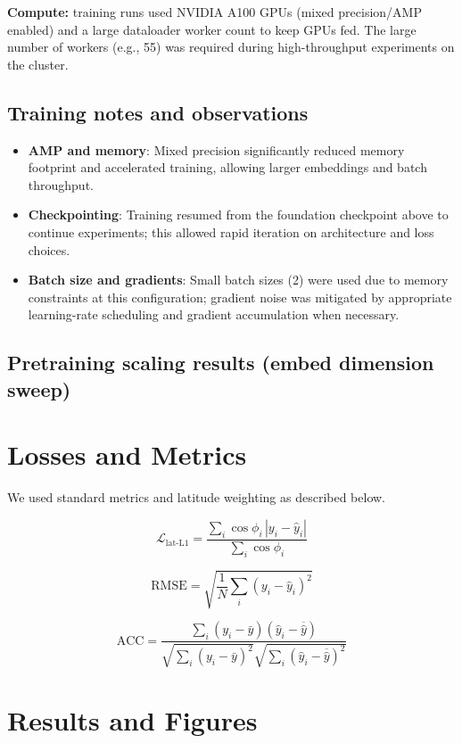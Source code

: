 \documentclass[12pt]{report}
\begin{document}
\noindent\textbf{Compute:} training runs used NVIDIA A100 GPUs (mixed precision/AMP enabled) and a large dataloader worker count to keep GPUs fed. The large number of workers (e.g., 55) was required during high-throughput experiments on the cluster.

\section{Training notes and observations}
\begin{itemize}
  \item \textbf{AMP and memory}: Mixed precision significantly reduced memory footprint and accelerated training, allowing larger embeddings and batch throughput.
  \item \textbf{Checkpointing}: Training resumed from the foundation checkpoint above to continue experiments; this allowed rapid iteration on architecture and loss choices.
  \item \textbf{Batch size and gradients}: Small batch sizes (2) were used due to memory constraints at this configuration; gradient noise was mitigated by appropriate learning-rate scheduling and gradient accumulation when necessary.
\end{itemize}

\section{Pretraining scaling results (embed dimension sweep)}



\chapter{Losses and Metrics}

We used standard metrics and latitude weighting as described below.

\[
\mathcal{L}_{\text{lat-L1}}=\frac{\sum_i \cos\phi_i\,|y_i-\hat{y}_i|}{\sum_i \cos\phi_i}
\]

\[
\mathrm{RMSE}=\sqrt{\frac{1}{N}\sum_i (y_i-\hat{y}_i)^2}
\]

\[
\mathrm{ACC}=\frac{\sum_i (y_i-\bar y)(\hat{y}_i-\overline{\hat{y}})}
{\sqrt{\sum_i (y_i-\bar y)^2}\sqrt{\sum_i (\hat{y}_i-\overline{\hat{y}})^2}}
\]

\FloatBarrier

\chapter{Results and Figures}
\end{document}
